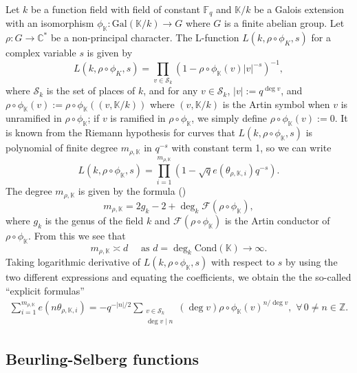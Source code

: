 \documentclass[12pt]{amsart}
\theoremstyle{plain}
\begin{document}
Let $k$ be a function field with field of constant ${{\mathbb F}_q}$ and ${{\mathbb K}}/k$ be a Galois extension with an isomorphism ${\phi_{{\mathbb K}}}: \mathrm{Gal}({{\mathbb K}}/k) \to G$ where $G$ is a finite abelian group. Let $\rho: G \to {{\mathbb C}}^*$ be a non-principal character. The L-function $L(k,\rho \circ \phi_K,s)$ for a complex variable $s$ is given by
\[L(k,\rho \circ \phi_K,s)=\prod_{v \in {\mathcal{S}_k}} \left(1-\rho \circ {\phi_{{\mathbb K}}} \left(v\right) |v|^{-s}\right)^{-1}, \]
where ${\mathcal{S}_k}$ is the set of places of $k$, and for any $v \in {\mathcal{S}_k}$, $|v|:=q^{\deg v}$, and $\rho \circ {\phi_{{\mathbb K}}}(v):=\rho \circ {\phi_{{\mathbb K}}} \left((v,{{\mathbb K}}/k)\right)$ where $(v,{{\mathbb K}}/k)$ is the Artin symbol when $v$ is unramified in $\rho \circ {\phi_{{\mathbb K}}}$; if $v$ is ramified in $\rho \circ {\phi_{{\mathbb K}}}$, we simply define $\rho \circ {\phi_{{\mathbb K}}}\left(v\right):=0$. It is known from the Riemann hypothesis for curves that $L(k,\rho \circ {\phi_{{\mathbb K}}},s)$ is polynomial of finite degree $m_{\rho,{{\mathbb K}}}$ in $q^{-s}$ with constant term 1, so we can write
\[L(k,\rho \circ {\phi_{{\mathbb K}}},s)=\prod_{i=1}^{m_{\rho,{{\mathbb K}}}} \left(1-\sqrt{q}e(\theta_{\rho,{{\mathbb K}},i})q^{-s}\right).\]
The degree $m_{\rho,{{\mathbb K}}}$ is given by the formula (\cite{ros}) \[m_{\rho,{{\mathbb K}}}=2g_k-2+\deg_k \mathcal{F}(\rho \circ {\phi_{{\mathbb K}}}), \]
where $g_k$ is the genus of the field $k$ and $\mathcal{F}(\rho \circ {\phi_{{\mathbb K}}})$ is the Artin conductor of $\rho \circ {\phi_{{\mathbb K}}}$. From this we see that
\[m_{\rho,{{\mathbb K}}} \asymp d \quad \mbox{ as } d=\deg_k \mathrm{Cond}({{\mathbb K}}) \to \infty. \]
Taking logarithmic derivative of $L(k,\rho \circ {\phi_{{\mathbb K}}},s)$ with respect to $s$ by using the two different expressions and equating the coefficients, we obtain the the so-called ``explicit formulas''
\begin{eqnarray} \label{2:exp} \sum_{i=1}^{m_{\rho,{{\mathbb K}}}}e(n \theta_{\rho,{{\mathbb K}},i})=-q^{-|n|/2}\sum_{\substack{v \in {\mathcal{S}_k} \\
\deg v\mid n}} (\deg v) \rho \circ {\phi_{{\mathbb K}}}(v)^{n/\deg v}, \,\, \forall \, 0 \ne n \in {{\mathbb Z}}. \end{eqnarray}

\subsection{Beurling-Selberg functions}
\end{document}
